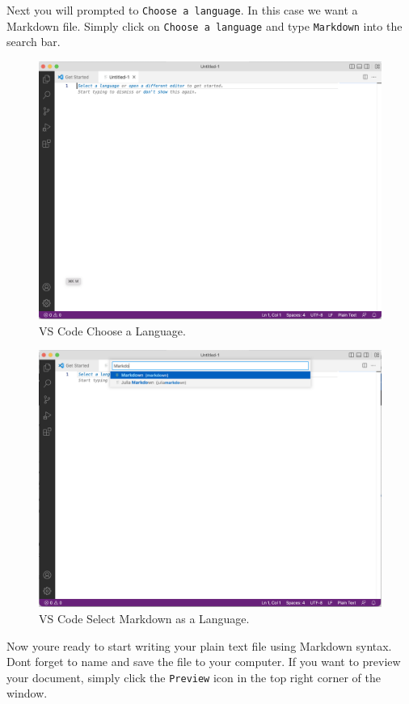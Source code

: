 \documentclass[
]{book}
\begin{document}
Next you will prompted to \texttt{Choose\ a\ language}. In this case we want a Markdown file. Simply click on \texttt{Choose\ a\ language} and type \texttt{Markdown} into the search bar.

\begin{figure}
\centering
\includegraphics{images/vs-code-3.png}
\caption{VS Code Choose a Language.}
\end{figure}

\begin{figure}
\centering
\includegraphics{images/vs-code-4.png}
\caption{VS Code Select Markdown as a Language.}
\end{figure}

Now you\textquotesingle re ready to start writing your plain text file using Markdown syntax. Don\textquotesingle t forget to name and save the file to your computer. If you want to preview your document, simply click the \texttt{Preview} icon in the top right corner of the window.
\end{document}
